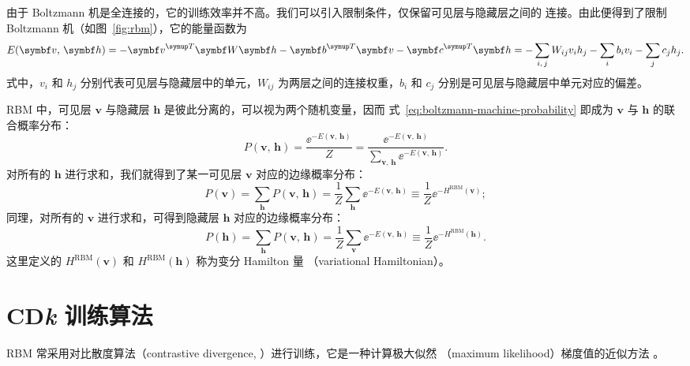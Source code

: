 由于 Boltzmann 机是全连接的，它的训练效率并不高。我们可以引入限制条件，仅保留可见层与隐藏层之间的
连接。由此便得到了限制 Boltzmann 机（如图~\ref{fig:rbm}），它的能量函数为
\cite{exact,rbmonline,chen2018equivalence}
\begin{equation}
  \label{eq:rbm-energy}
  E(\bm{v},\,\bm{h})
  = - \bm{v}^\trans \bm{W} \bm{h} - \bm{b}^\trans \bm{v} - \bm{c}^\trans \bm{h}
  = - \sum_{i,\,j} W_{ij} v_i h_j - \sum_i b_i v_i - \sum_j c_j h_j.
\end{equation}
式中，$v_i$ 和 $h_j$ 分别代表可见层与隐藏层中的单元，$W_{ij}$ 为两层之间的连接权重，$b_i$ 和 $c_j$
分别是可见层与隐藏层中单元对应的偏差。

RBM 中，可见层 $\bm{v}$ 与隐藏层 $\bm{h}$ 是彼此分离的，可以视为两个随机变量，因而
式~\eqref{eq:boltzmann-machine-probability} 即成为 $\bm{v}$ 与 $\bm{h}$ 的联合概率分布：
\begin{equation}
  P(\bm{v},\,\bm{h})
  = \frac{\ee^{-E(\bm{v},\,\bm{h})}}{Z}
  = \frac{\ee^{-E(\bm{v},\,\bm{h})}}{\sum_{\bm{v},\,\bm{h}}\ee^{-E(\bm{v},\,\bm{h})}}.
\end{equation}
对所有的 $\bm{h}$ 进行求和，我们就得到了某一可见层 $\bm{v}$ 对应的边缘概率分布：
\begin{equation}
  \label{eq:rbm-probability-v}
  P(\bm{v}) = \sum_{\bm{h}} P(\bm{v},\,\bm{h})
            = \frac{1}{Z} \sum_{\bm{h}} \ee^{-E(\bm{v},\,\bm{h})}
            \equiv \frac{1}{Z} \ee^{-H^{\text{RBM}}(\bm{v})};
\end{equation}
同理，对所有的 $\bm{v}$ 进行求和，可得到隐藏层 $\bm{h}$ 对应的边缘概率分布：
\begin{equation}
  \label{eq:rbm-probability-h}
  P(\bm{h}) = \sum_{\bm{h}} P(\bm{v},\,\bm{h})
            = \frac{1}{Z} \sum_{\bm{v}} \ee^{-E(\bm{v},\,\bm{h})}
            \equiv \frac{1}{Z} \ee^{-H^{\text{RBM}}(\bm{h})}.
\end{equation}
这里定义的 $H^{\text{RBM}}(\bm{v})$ 和 $H^{\text{RBM}}(\bm{h})$ 称为变分 Hamilton 量
（variational Hamiltonian）\cite{exact}。

\section{\texorpdfstring{CD\raisebox{0.13ex}{-}\textit{k}}{CD-k} 训练算法}
\label{sec:CDk-algorithm}

RBM 常采用对比散度算法（contrastive divergence, \CDk）进行训练，它是一种计算极大似然
（maximum likelihood）梯度值的近似方法
\cite{zhouzhihua,rbmonline,lyy1994rbm,hinton2012practical,hinton2002training}。

